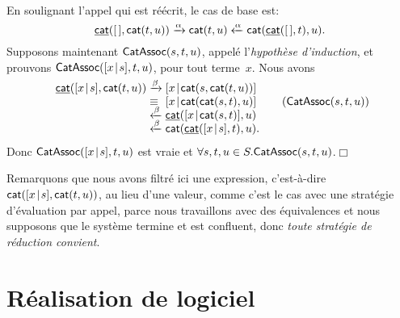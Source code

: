 \noindent En soulignant l'appel qui est réécrit, le cas de base
est:
\begin{equation*} \ufun{cat}(\el,\fun{cat}(t,u))
  \xrightarrow{\smash{\alpha}} \fun{cat}(t,u)
  \xleftarrow{\smash{\alpha}} \fun{cat}(\ufun{cat}(\el,t),u).
  \index{cat@\fun{cat/2}}
\end{equation*}
Supposons maintenant \(\textsf{CatAssoc}({s,t,u})\), appelé
l'\emph{hypothèse d'induction}, et
prouvons
\(\textsf{CatAssoc}({[{x}\!\mid\!{s}],t,u})\),
pour tout terme~\(x\). Nous avons
\begin{equation*}
\begin{array}{r@{\;}l@{\;}l@{\qquad}r@{}}
  \ufun{cat}(\cons{x}{s},\fun{cat}(t,u))
& \xrightarrow{\smash\beta}
& \cons{x}{\fun{cat}(s,\fun{cat}(t,u))}\\
& \equiv
& \cons{x}{\fun{cat}(\fun{cat}(s,t),u)}
& (\pred{CatAssoc}{s,t,u})\\
& \xleftarrow{\smash\beta}
& \ufun{cat}(\cons{x}{\fun{cat}(s,t)},u)\\
& \xleftarrow{\smash\beta}
& \fun{cat}(\ufun{cat}(\cons{x}{s},t),u).\index{cat@\fun{cat/2}}
\end{array}
\end{equation*}
Donc
\(\textsf{CatAssoc}({[{x}\!\mid\!{s}],t,u})\) est vraie et \(\forall s,t,u \in
S.\textsf{CatAssoc}({s,t,u})\).\hfill\(\Box\)

Remarquons que nous avons filtré ici une expression, c'est-à-dire
\(\textsf{cat}([{x}\!\mid\!{s}],\textsf{cat}(t,u))\), au lieu d'une valeur, comme
c'est le cas avec une stratégie d'évaluation par appel, parce nous
travaillons avec des équivalences et nous supposons que le système
termine et est confluent, donc \emph{toute stratégie de réduction
convient}.

\section{Réalisation de logiciel}
\label{sec:implementation}


